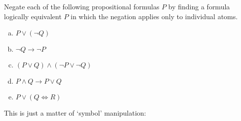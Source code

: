 \documentclass[11pt,letterpaper]{article}
\begin{document}
\newpage



 Negate each of the following propositional formulas $P$ by finding a formula logically equivalent $P$ in which the negation applies only to individual atoms. 
	\begin{enumerate}[(a),topsep=0pt]
	\item $P \vee (\neg Q)$
	\item $\neg Q \to \neg P$
	\item $(P \vee Q) \wedge (\neg P \vee \neg Q)$
	\item $P \wedge Q \to P \vee Q$
	\item $P \vee (Q \Leftrightarrow R)$
	\end{enumerate}

\sol This is just a matter of `symbol' manipulation:
\end{document}
